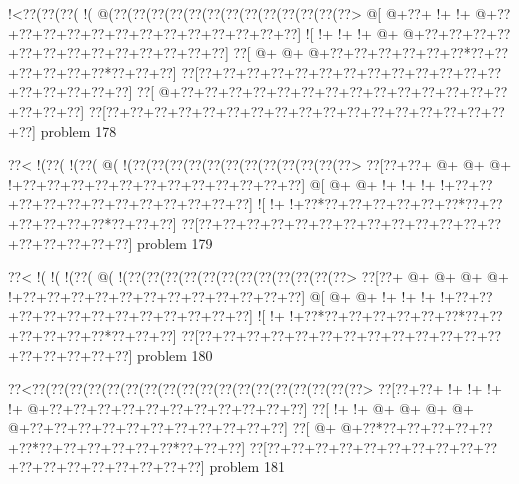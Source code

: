\vbox{\vbox{\goo
\- !<\0??(\0??(\0??(\- !(\- @(\0??(\0??(\0??(\0??(\0??(\0??(\0??(\0??(\0??(\0??(\0??(\0??(\0??>
\- @[\- @+\0??+\- !+\- !+\- @+\0??+\0??+\0??+\0??+\0??+\0??+\0??+\0??+\0??+\0??+\0??+\0??+\0??]
\- ![\- !+\- !+\- !+\- @+\- @+\0??+\0??+\0??+\0??+\0??+\0??+\0??+\0??+\0??+\0??+\0??+\0??+\0??]
\0??[\- @+\- @+\- @+\0??+\0??+\0??+\0??+\0??+\0??*\0??+\0??+\0??+\0??+\0??+\0??*\0??+\0??+\0??]
\0??[\0??+\0??+\0??+\0??+\0??+\0??+\0??+\0??+\0??+\0??+\0??+\0??+\0??+\0??+\0??+\0??+\0??+\0??]
\0??[\- @+\0??+\0??+\0??+\0??+\0??+\0??+\0??+\0??+\0??+\0??+\0??+\0??+\0??+\0??+\0??+\0??+\0??]
\0??[\0??+\0??+\0??+\0??+\0??+\0??+\0??+\0??+\0??+\0??+\0??+\0??+\0??+\0??+\0??+\0??+\0??+\0??]
}
\hfil problem 178\hfil\break
}



\vbox{\vbox{\goo
\0??<\- !(\0??(\- !(\0??(\- @(\- !(\0??(\0??(\0??(\0??(\0??(\0??(\0??(\0??(\0??(\0??(\0??(\0??>
\0??[\0??+\0??+\- @+\- @+\- @+\- !+\0??+\0??+\0??+\0??+\0??+\0??+\0??+\0??+\0??+\0??+\0??+\0??]
\- @[\- @+\- @+\- !+\- !+\- !+\- !+\0??+\0??+\0??+\0??+\0??+\0??+\0??+\0??+\0??+\0??+\0??+\0??]
\- ![\- !+\- !+\0??*\0??+\0??+\0??+\0??+\0??+\0??*\0??+\0??+\0??+\0??+\0??+\0??*\0??+\0??+\0??]
\0??[\0??+\0??+\0??+\0??+\0??+\0??+\0??+\0??+\0??+\0??+\0??+\0??+\0??+\0??+\0??+\0??+\0??+\0??]
}
\hfil problem 179\hfil\break
}



\vbox{\vbox{\goo
\0??<\- !(\- !(\- !(\0??(\- @(\- !(\0??(\0??(\0??(\0??(\0??(\0??(\0??(\0??(\0??(\0??(\0??(\0??>
\0??[\0??+\- @+\- @+\- @+\- @+\- !+\0??+\0??+\0??+\0??+\0??+\0??+\0??+\0??+\0??+\0??+\0??+\0??]
\- @[\- @+\- @+\- !+\- !+\- !+\- !+\0??+\0??+\0??+\0??+\0??+\0??+\0??+\0??+\0??+\0??+\0??+\0??]
\- ![\- !+\- !+\0??*\0??+\0??+\0??+\0??+\0??+\0??*\0??+\0??+\0??+\0??+\0??+\0??*\0??+\0??+\0??]
\0??[\0??+\0??+\0??+\0??+\0??+\0??+\0??+\0??+\0??+\0??+\0??+\0??+\0??+\0??+\0??+\0??+\0??+\0??]
}
\hfil problem 180\hfil\break
}



\vbox{\vbox{\goo
\0??<\0??(\0??(\0??(\0??(\0??(\0??(\0??(\0??(\0??(\0??(\0??(\0??(\0??(\0??(\0??(\0??(\0??(\0??>
\0??[\0??+\0??+\- !+\- !+\- !+\- !+\- @+\0??+\0??+\0??+\0??+\0??+\0??+\0??+\0??+\0??+\0??+\0??]
\0??[\- !+\- !+\- @+\- @+\- @+\- @+\- @+\0??+\0??+\0??+\0??+\0??+\0??+\0??+\0??+\0??+\0??+\0??]
\0??[\- @+\- @+\0??*\0??+\0??+\0??+\0??+\0??+\0??*\0??+\0??+\0??+\0??+\0??+\0??*\0??+\0??+\0??]
\0??[\0??+\0??+\0??+\0??+\0??+\0??+\0??+\0??+\0??+\0??+\0??+\0??+\0??+\0??+\0??+\0??+\0??+\0??]
}
\hfil problem 181\hfil\break
}



